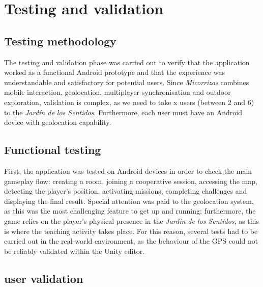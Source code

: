 \chapter{Testing and validation}
\section{Testing methodology}
The testing and validation phase was carried out to verify that the application worked as a functional Android prototype and that the experience was understandable and satisfactory for potential users. Since \textit{Micorrizas} combines mobile interaction, geolocation, multiplayer synchronisation and outdoor exploration, validation is complex, as we need to take x users (between 2 and 6) to the \textit{Jardín de los Sentidos}. Furthermore, each user must have an Android device with geolocation capability.
\section{Functional testing}
First, the application was tested on Android devices in order to check the main gameplay flow: creating a room, joining a cooperative session, accessing the map, detecting the player’s position, activating missions, completing challenges and displaying the final result. Special attention was paid to the geolocation system, as this was the most challenging feature to get up and running; furthermore, the game relies on the player’s physical presence in the \textit{Jardín de los Sentidos}, as this is where the teaching activity takes place. For this reason, several tests had to be carried out in the real-world environment, as the behaviour of the GPS could not be reliably validated within the Unity editor.
\section{user validation}

